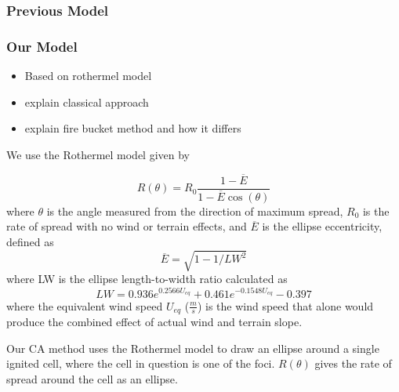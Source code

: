 \documentclass{article}
\begin{document}
\subsubsection{Previous Model}

\subsubsection{Our Model}


\begin{itemize}
\item Based on rothermel model
\item explain classical approach
\item explain fire bucket method and how it differs
\end{itemize}

We use the Rothermel model given by

\begin{equation}
\label{eq:rothermel}
R(\theta) = R_0 \frac{1-\overline{E}}{1 -\overline{E}\cos(\theta) }
\end{equation}
where $\theta$ is the angle measured from the direction of maximum spread, $R_0$ is the rate of spread with no wind or terrain effects, and $\overline{E}$ is the ellipse eccentricity, defined as
\begin{equation}
\label{eq:ebar}
\overline{E} = \sqrt{1 - 1/LW^2}
\end{equation}
where LW is the ellipse length-to-width ratio calculated as 
\begin{equation}
\label{eq:lw}
LW =  0.936 e^{0.2566U_{eq}} + 0.461e^{-0.1548U_{eq}} - 0.397
\end{equation}
where the equivalent wind speed $U_{eq}$ ($\frac{m}{s}$) is the wind speed that alone would produce the combined effect of actual wind and terrain slope. 

Our CA method uses the Rothermel model to draw an ellipse around a single ignited cell, where the cell in question is one of the foci. $R(\theta)$ gives the rate of spread around the cell as an ellipse. 
\end{document}
